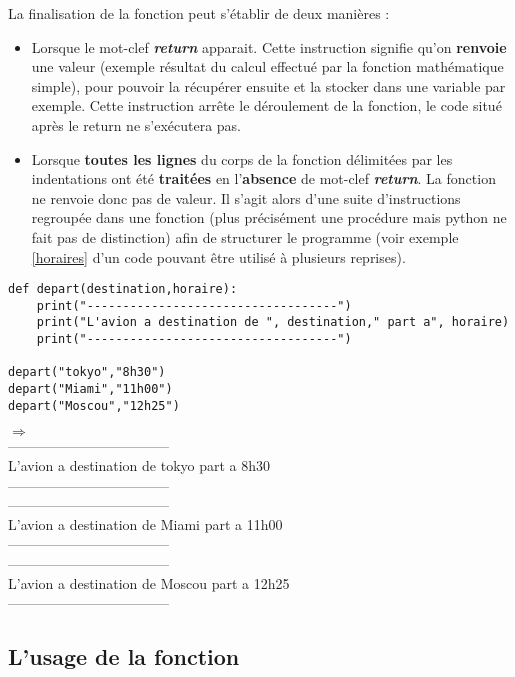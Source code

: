 La finalisation de la fonction peut s'établir de deux manières :
\begin{itemize}
	\item Lorsque le mot-clef \textbf{\textit{return}} apparait. Cette instruction signifie qu'on \textbf{renvoie} une valeur (exemple résultat du calcul effectué par la fonction mathématique simple), pour pouvoir la récupérer ensuite et la stocker dans une variable par exemple. Cette instruction arrête le déroulement de la fonction, le code situé après le return ne s'exécutera pas.
	\item Lorsque \textbf{toutes les lignes} du corps de la fonction délimitées par les indentations ont été \textbf{traitées} en l'\textbf{absence} de mot-clef \textbf{\textit{return}}. La fonction ne renvoie donc pas de valeur. Il s'agit alors d'une suite d'instructions regroupée dans une fonction (plus précisément une procédure mais python ne fait pas de  distinction) afin de structurer le programme (voir exemple  \ref{horaires} d'un code pouvant être utilisé à plusieurs reprises). 

	
\end{itemize}

\begin{lstlisting}[frame=lines,float=h,caption={Fonction à paramètres},label=horaires]
def depart(destination,horaire):
    print("-----------------------------------")
    print("L'avion a destination de ", destination," part a", horaire)
    print("-----------------------------------")
    
depart("tokyo","8h30")
depart("Miami","11h00")
depart("Moscou","12h25")

\end{lstlisting}
$\Rightarrow$\\
-----------------------------------\\
L'avion a destination de  tokyo  part a 8h30\\
-----------------------------------\\
-----------------------------------\\
L'avion a destination de  Miami  part a 11h00\\
-----------------------------------\\
-----------------------------------\\
L'avion a destination de  Moscou  part a 12h25\\
-----------------------------------\\


\subsection{L'usage de la fonction}

